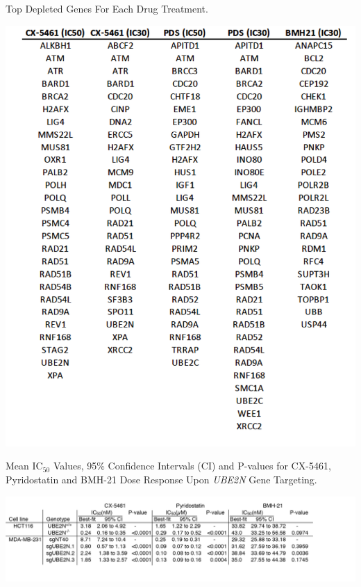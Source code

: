 \clearpage

\begin{table}
\caption{Top Depleted Genes For Each Drug Treatment.}
\centering
\includegraphics[width=1\textwidth]{../tables/Table1c_81_genes_list}
\label{table:81-genes list}
\end{table}

\clearpage

\begin{table}
\caption{Mean IC$_{50}$ Values, 95\% Confidence Intervals (CI) and P-values for CX-5461, Pyridostatin and BMH-21 Dose Response Upon \textit{UBE2N} Gene Targeting.}
\centering
\includegraphics[width=1\textwidth]{../tables/Table_IC50}
\label{table:IC50}
\end{table}

\clearpage